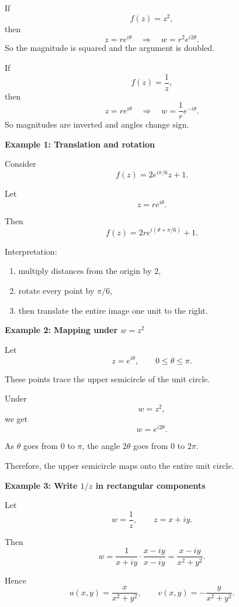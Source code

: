 \begin{conceptbox}
    If
    \[
        f(z)=z^2,
    \]
    then
    \[
        z=re^{i\theta}
        \quad \Longrightarrow \quad
        w=r^2e^{i2\theta}.
    \]
    So the magnitude is squared and the argument is doubled.
\end{conceptbox}

\begin{conceptbox}
    If
    \[
        f(z)=\frac{1}{z},
    \]
    then
    \[
        z=re^{i\theta}
        \quad \Longrightarrow \quad
        w=\frac{1}{r}e^{-i\theta}.
    \]
    So magnitudes are inverted and angles change sign.
\end{conceptbox}

\begin{examplebox}
    \textbf{Example 1: Translation and rotation}

    Consider
    \[
        f(z)=2e^{i\pi/6}z+1.
    \]

    Let
    \[
        z=re^{i\theta}.
    \]

    Then
    \[
        f(z)=2re^{i(\theta+\pi/6)}+1.
    \]

    Interpretation:
    \begin{enumerate}
        \item multiply distances from the origin by $2$,
        \item rotate every point by $\pi/6$,
        \item then translate the entire image one unit to the right.
    \end{enumerate}
\end{examplebox}

\begin{examplebox}
    \textbf{Example 2: Mapping under $w=z^2$}

    Let
    \[
        z=e^{i\theta}, \qquad 0\le \theta \le \pi.
    \]

    These points trace the upper semicircle of the unit circle.

    Under
    \[
        w=z^2,
    \]
    we get
    \[
        w=e^{i2\theta}.
    \]

    As $\theta$ goes from $0$ to $\pi$, the angle $2\theta$ goes from $0$ to $2\pi$.

    Therefore, the upper semicircle maps onto the entire unit circle.
\end{examplebox}

\begin{examplebox}
    \textbf{Example 3: Write $1/z$ in rectangular components}

    Let
    \[
        w=\frac{1}{z}, \qquad z=x+iy.
    \]

    Then
    \[
        w=\frac{1}{x+iy}\cdot \frac{x-iy}{x-iy}
        =
        \frac{x-iy}{x^2+y^2}.
    \]

    Hence
    \[
        u(x,y)=\frac{x}{x^2+y^2},
        \qquad
        v(x,y)= -\frac{y}{x^2+y^2}.
    \]
\end{examplebox}

